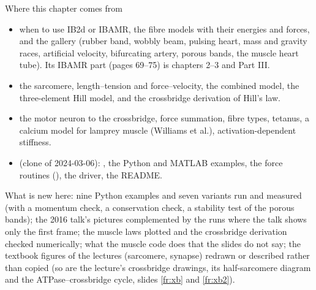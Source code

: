 \documentclass[aspectratio=169,11pt]{beamer}
\begin{document}
\begin{frame}{Where this chapter comes from}
\label{fr:sources}
\scriptsize
\begin{itemize}
  \item {} when to use IB2d or IBAMR, the fibre models with their energies and forces, and the gallery (rubber band, wobbly beam, pulsing heart, mass and gravity races, artificial velocity, bifurcating artery, porous bands, the muscle heart tube). Its IBAMR part (pages 69--75) is chapters 2--3 and Part III.
  \item {} the sarcomere, length--tension and force--velocity, the combined model, the three-element Hill model, and the crossbridge derivation of Hill's law.
  \item {} the motor neuron to the crossbridge, force summation, fibre types, tetanus, a calcium model for lamprey muscle (Williams et al.), activation-dependent stiffness.
  \item {} (clone of 2024-03-06): , the Python and MATLAB examples, the force routines (), the driver, the README.
\end{itemize}
What is new here: nine Python examples and seven variants run and measured (with a momentum check, a conservation check, a stability test of the porous bands); the 2016 talk's pictures complemented by the runs where the talk shows only the first frame; the muscle laws plotted and the crossbridge derivation checked numerically; what the muscle code does that the slides do not say; the textbook figures of the lectures (sarcomere, synapse) redrawn or described rather than copied (so are the lecture's crossbridge drawings, its half-sarcomere diagram and the ATPase--crossbridge cycle, slides \ref{fr:xb} and \ref{fr:xb2}).
\end{frame}
\end{document}
